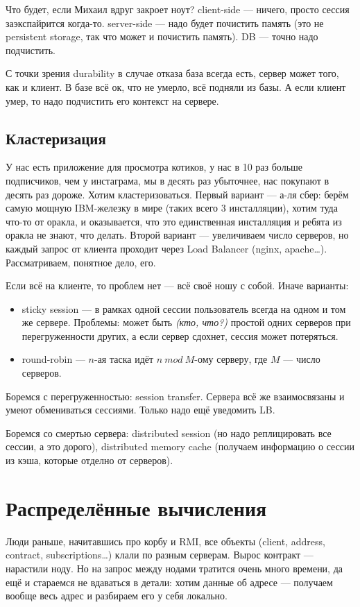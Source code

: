 \documentclass[11pt,a4paper]{article}
\begin{document}
Что будет, если Михаил вдруг закроет ноут? client-side — ничего, просто сессия заэкспайрится когда-то. server-side — надо будет почистить память (это не persistent storage, так что может и почистить память). DB — точно надо подчистить.

С точки зрения durability в случае отказа база всегда есть, сервер может того, как и клиент. В базе всё ок, что не умерло, всё подняли из базы. А если клиент умер, то надо подчистить его контекст на сервере.

\subsection{Кластеризация}
У нас есть приложение для просмотра котиков, у нас в 10 раз больше подписчиков, чем у инстаграма, мы в десять раз убыточнее, нас покупают в десять раз дороже. Хотим кластеризоваться. Первый вариант — а-ля сбер: берём самую мощную IBM-железку в мире (таких всего 3 инсталляции), хотим туда что-то от оракла, и оказывается, что это единственная инсталляция и ребята из оракла не знают, что делать. Второй вариант — увеличиваем число серверов, но каждый запрос от клиента проходит через Load Balancer (nginx, apache…). Рассматриваем, понятное дело, его.

Если всё на клиенте, то проблем нет — всё своё ношу с собой. Иначе варианты:
\begin{itemize}
\item sticky session — в рамках одной сессии пользователь всегда на одном и том же сервере. Проблемы: может быть \textit{(кто, что?)} простой одних серверов при перегруженности других, а если сервер сдохнет, сессия может потеряться.
\item round-robin — $n$-ая таска идёт $n \ mod \ M$-ому серверу, где $M$ — число серверов.
\end{itemize}

Боремся с перегруженностью: session transfer. Сервера всё же взаимосвязаны и умеют обмениваться сессиями. Только надо ещё уведомить LB.

Боремся со смертью сервера: distributed session (но надо реплицировать все сессии, а это дорого), distributed memory cache (получаем информацию о сессии из кэша, которые отделно от серверов).

\section{Распределённые вычисления}
Люди раньше, начитавшись про корбу и RMI, все объекты (client, address, contract, subscriptions…) клали по разным серверам. Вырос контракт — нарастили ноду. Но на запрос между нодами тратится очень много времени, да ещё и стараемся не вдаваться в детали: хотим данные об адресе — получаем вообще весь адрес и разбираем его у себя локально.
\end{document}
